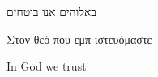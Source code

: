 \documentclass{minimal}
\begin{document}
באלוהים אנו בוטחים

\begin{greek}
  Στον θεό που εμπ ιστευόμαστε
\end{greek}


In God we trust
\end{document}
